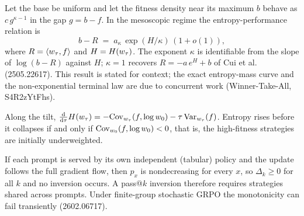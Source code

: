 \begin{theorem}
\label{thm:tiltlaw}
Let the base be uniform and let the fitness density near its maximum $b$ behave
as $c\,g^{\kappa-1}$ in the gap $g=b-f$. In the mesoscopic regime the
entropy-performance relation is
\begin{equation}
b-R \;=\; a_\kappa\,\exp(H/\kappa)\,(1+o(1)),
\end{equation}
where $R=\langle w_\tau, f\rangle$ and $H=H(w_\tau)$. The exponent $\kappa$ is identifiable
from the slope of $\log(b-R)$ against $H$; $\kappa=1$ recovers
$R=-a\,e^{H}+b$ of Cui et al. (2505.22617). This result is stated for context;
the exact entropy-mass curve and the non-exponential terminal law are due to
concurrent work (Winner-Take-All, S4R2zYtFhs).
\end{theorem}

\begin{lemma}
\label{lem:bump}
Along the tilt, $\tfrac{\mathrm{d}}{\mathrm{d}\tau}H(w_\tau)
=-\mathrm{Cov}_{w_\tau}(f,\log w_0)-\tau\,\mathrm{Var}_{w_\tau}(f)$.
Entropy rises before it collapses if and only if
$\mathrm{Cov}_{w_0}(f,\log w_0)<0$, that is, the high-fitness strategies are
initially underweighted.
\end{lemma}

\begin{lemma}
\label{lem:sharing}
If each prompt is served by its own independent (tabular) policy and the update
follows the full gradient flow, then $p_x$ is nondecreasing for every $x$, so
$\Delta_k\ge0$ for all $k$ and no inversion occurs. A pass@$k$ inversion
therefore requires strategies shared across prompts. Under finite-group
stochastic GRPO the monotonicity can fail transiently (2602.06717).
\end{lemma}

